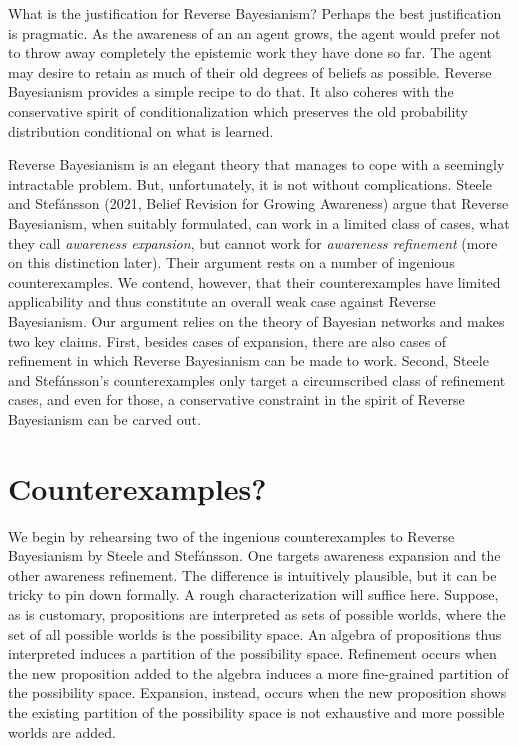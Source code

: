 \documentclass[
  11pt,
  dvipsnames,enabledeprecatedfontcommands]{scrartcl}
\begin{document}
What is the justification for Reverse Bayesianism? Perhaps the best
justification is pragmatic. As the awareness of an an agent grows, the
agent would prefer not to throw away completely the epistemic work they
have done so far. The agent may desire to retain as much of their old
degrees of beliefs as possible. Reverse Bayesianism provides a simple
recipe to do that. It also coheres with the conservative spirit of
conditionalization which preserves the old probability distribution
conditional on what is learned.

Reverse Bayesianism is an elegant theory that manages to cope with a
seemingly intractable problem. But, unfortunately, it is not without
complications. Steele and Stefánsson (2021, Belief Revision for Growing
Awareness) argue that Reverse Bayesianism, when suitably formulated, can
work in a limited class of cases, what they call
\textit{awareness expansion}, but cannot work for
\textit{awareness refinement} (more on this distinction later). Their
argument rests on a number of ingenious counterexamples. We contend,
however, that their counterexamples have limited applicability and thus
constitute an overall weak case against Reverse Bayesianism. Our
argument relies on the theory of Bayesian networks and makes two key
claims. First, besides cases of expansion, there are also cases of
refinement in which Reverse Bayesianism can be made to work. Second,
Steele and Stefánsson's counterexamples only target a circumscribed
class of refinement cases, and even for those, a conservative constraint
in the spirit of Reverse Bayesianism can be carved out.

\hypertarget{counterexamples}{%
\section{Counterexamples?}\label{counterexamples}}

We begin by rehearsing two of the ingenious counterexamples to Reverse
Bayesianism by Steele and Stefánsson. One targets awareness expansion
and the other awareness refinement. The difference is intuitively
plausible, but it can be tricky to pin down formally. A rough
characterization will suffice here. Suppose, as is customary,
propositions are interpreted as sets of possible worlds, where the set
of all possible worlds is the possibility space. An algebra of
propositions thus interpreted induces a partition of the possibility
space. Refinement occurs when the new proposition added to the algebra
induces a more fine-grained partition of the possibility space.
Expansion, instead, occurs when the new proposition shows the existing
partition of the possibility space is not exhaustive and more possible
worlds are added.
\end{document}

